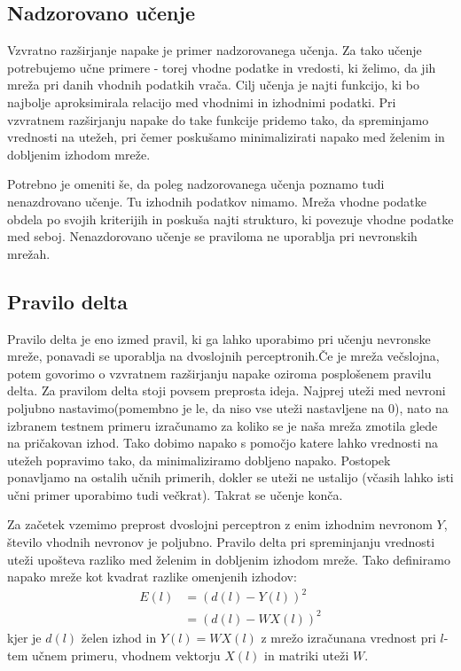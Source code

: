 \documentclass[mat1]{fmfdelo}
\begin{document}
\subsection{Nadzorovano učenje}
Vzvratno razširjanje napake je primer nadzorovanega učenja. Za tako učenje potrebujemo učne primere - torej vhodne podatke in vredosti, ki želimo, da jih mreža pri danih vhodnih podatkih vrača. Cilj učenja je najti funkcijo, ki bo najbolje aproksimirala relacijo med vhodnimi in izhodnimi podatki. Pri vzvratnem razširjanju napake do take funkcije pridemo tako, da spreminjamo vrednosti na utežeh, pri čemer poskušamo minimalizirati napako med želenim in dobljenim izhodom mreže.

Potrebno je omeniti še, da poleg nadzorovanega učenja poznamo tudi nenazdrovano učenje. Tu izhodnih podatkov nimamo. Mreža vhodne podatke obdela po svojih kriterijih in poskuša najti strukturo, ki povezuje vhodne podatke med seboj. Nenazdorovano učenje se praviloma ne uporablja pri nevronskih mrežah.
\subsection{Pravilo delta}
Pravilo delta je eno izmed pravil, ki ga lahko uporabimo pri učenju nevronske mreže, ponavadi se uporablja na dvoslojnih perceptronih.Če je mreža večslojna, potem govorimo o vzvratnem razširjanju napake oziroma posplošenem pravilu delta. Za pravilom delta stoji povsem preprosta ideja. Najprej uteži med nevroni poljubno nastavimo(pomembno je le, da niso vse uteži nastavljene na 0), nato na izbranem testnem primeru izračunamo za koliko se je naša mreža zmotila glede na pričakovan izhod. Tako dobimo napako s pomočjo katere lahko vrednosti na utežeh popravimo tako, da minimaliziramo dobljeno napako. Postopek ponavljamo na ostalih učnih primerih, dokler se uteži ne ustalijo (včasih lahko isti učni primer uporabimo tudi večkrat). Takrat se učenje konča.

Za začetek vzemimo preprost dvoslojni perceptron z enim izhodnim nevronom $Y$, število vhodnih nevronov je poljubno. Pravilo delta pri spreminjanju vrednosti uteži upošteva razliko med želenim in dobljenim izhodom mreže. Tako definiramo napako mreže kot kvadrat razlike omenjenih izhodov:
%
\begin{equation}
\begin{aligned}
E(l) &= (d(l)-Y(l))^2 \\
&= (d(l)-WX(l))^2
\end{aligned}
\end{equation}
%
kjer je $d(l)$ želen izhod in $Y(l)= WX(l)$ z mrežo izračunana vrednost pri $l$-tem učnem primeru, vhodnem vektorju $X(l)$ in matriki uteži $W$.
\end{document}

